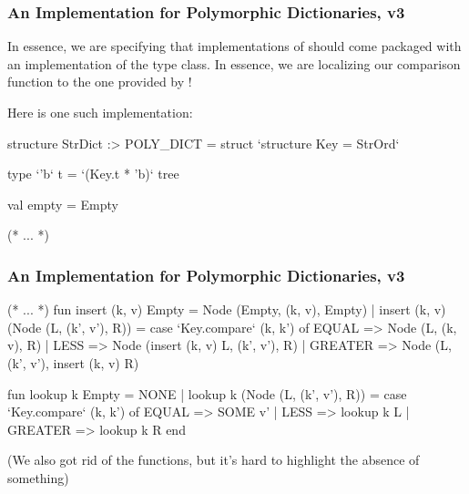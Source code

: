 \documentclass[aspectratio=169, handout]{beamer}
\begin{document}
\begin{frame}[fragile]
  \frametitle{An Implementation for Polymorphic Dictionaries, v3}

  In essence, we are specifying that implementations of 
  should come packaged with an implementation of the  type class.
  In essence, we are localizing our comparison function to the one provided
  by !

  \pause
  \vspace{\fill}

  Here is one such implementation:

  \begin{codeblock}
    structure StrDict :> POLY_DICT =
      struct
        `structure Key = StrOrd`

        type `'b` t = `(Key.t * 'b)` tree

        val empty = Empty

      (* ... *)
  \end{codeblock}
\end{frame}

\begin{frame}[fragile]
  \frametitle{An Implementation for Polymorphic Dictionaries, v3}

  \small
  \begin{codeblock}
    (* ... *)
      fun insert (k, v) Empty = Node (Empty, (k, v), Empty)
        | insert (k, v) (Node (L, (k', v'), R)) =
            case `Key.compare` (k, k') of
              EQUAL   => Node (L, (k, v), R)
            | LESS    => Node (insert (k, v) L, (k', v'), R)
            | GREATER => Node (L, (k', v'), insert (k, v) R)

      fun lookup k Empty = NONE
        | lookup k (Node (L, (k', v'), R)) =
            case `Key.compare` (k, k') of
              EQUAL   => SOME v'
            | LESS    => lookup k L
            | GREATER => lookup k R
    end
  \end{codeblock}

  \pause
  \vspace{\fill}

  (We also got rid of the  functions, but it's hard to highlight the
  absence of something)
\end{frame}
\end{document}
